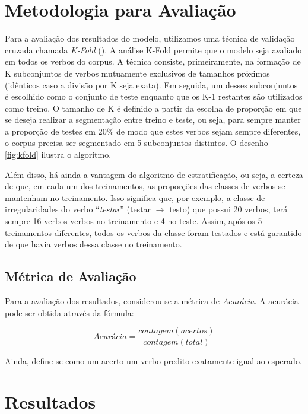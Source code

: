 \section{Metodologia para Avaliação}
\label{sec:results}

 Para a avaliação dos resultados do modelo, utilizamos uma técnica de validação cruzada chamada \textit{K-Fold} (\cite{kfold:2018}). A análise K-Fold permite que o modelo seja avaliado em todos os verbos do corpus. A técnica consiste, primeiramente, na formação de K subconjuntos de verbos mutuamente exclusivos de tamanhos próximos (idênticos caso a divisão por K seja exata). Em seguida, um desses subconjuntos é escolhido como o conjunto de teste enquanto que os K-1 restantes são utilizados como treino. O tamanho de K é definido a partir da escolha de proporção em que se deseja realizar a segmentação entre treino e teste, ou seja, para sempre manter a proporção de testes em 20\% de modo que estes verbos sejam sempre diferentes, o corpus precisa ser segmentado em 5 subconjuntos distintos. O desenho \ref{fig:kfold} ilustra o algoritmo. 



Além disso, há ainda a vantagem do algoritmo de estratificação, ou seja, a certeza de que, em cada um dos treinamentos, as proporções das classes de verbos se mantenham no treinamento. Isso significa que, por exemplo, a classe de irregularidades do verbo “\textit{testar}” (testar $\rightarrow$ testo) que possui 20 verbos, terá sempre 16 verbos verbos no treinamento e 4 no teste. Assim, após os 5 treinamentos diferentes, todos os verbos da classe foram testados e está garantido de que havia verbos dessa classe no treinamento.

\subsection{Métrica de Avaliação}

Para a avaliação dos resultados, considerou-se a métrica de \textit{Acurácia}. A acurácia pode ser obtida através da fórmula:

\begin{equation}
    Acurácia = \frac{contagem(acertos)}{contagem(total)}
\end{equation}

Ainda, define-se como um acerto um verbo predito exatamente igual ao esperado.

\section{Resultados}

